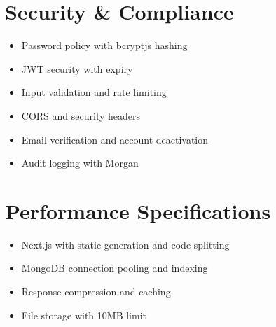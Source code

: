 \documentclass{article}
\begin{document}
\section{Security \& Compliance}
\begin{itemize}
    \item Password policy with bcryptjs hashing
    \item JWT security with expiry
    \item Input validation and rate limiting
    \item CORS and security headers
    \item Email verification and account deactivation
    \item Audit logging with Morgan
\end{itemize}

\section{Performance Specifications}
\begin{itemize}
    \item Next.js with static generation and code splitting
    \item MongoDB connection pooling and indexing
    \item Response compression and caching
    \item File storage with 10MB limit
\end{itemize}
\end{document}
